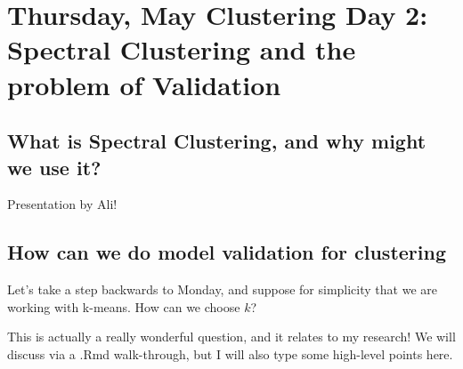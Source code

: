 \section{Thursday, May  Clustering Day 2: Spectral Clustering and the problem of Validation}

\subsection{What is Spectral Clustering, and why might we use it?}

Presentation by Ali! 

\subsection{How can we do model validation for clustering}

Let's take a step backwards to Monday, and suppose for simplicity that we are working with k-means. How can we choose $k$?

This is actually a really wonderful question, and it relates to my research! We will discuss via a .Rmd walk-through, but I will also type some high-level points here. 


